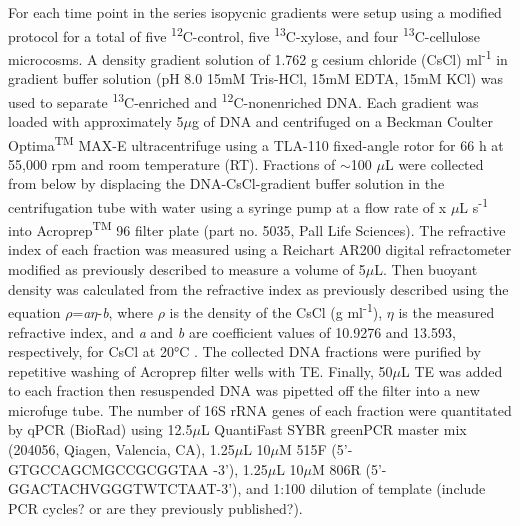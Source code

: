 For each time point in the series isopycnic gradients were setup using a modified protocol \cite{Neufeld_2007} for a total of five \textsuperscript{12}C-control, five \textsuperscript{13}C-xylose, and four \textsuperscript{13}C-cellulose microcosms. A density gradient solution of 1.762 g cesium chloride (CsCl) ml\textsuperscript{-1} in gradient buffer solution (pH 8.0 15mM Tris-HCl, 15mM EDTA, 15mM KCl) was used to separate \textsuperscript{13}C-enriched and \textsuperscript{12}C-nonenriched DNA. Each gradient was loaded with approximately 5$\mu$g of DNA and centrifuged on a Beckman Coulter Optima\textsuperscript{TM} MAX-E ultracentrifuge using a TLA-110 fixed-angle rotor for 66 h at 55,000 rpm and room temperature (RT). Fractions of $\sim$100 $\mu$L were collected from below by displacing the DNA-CsCl-gradient buffer solution in the centrifugation tube with water using a syringe pump at a flow rate of x $\mu$L s\textsuperscript{-1} \cite{Manefield_2002} into Acroprep\textsuperscript{TM} 96 filter plate (part no. 5035, Pall Life Sciences). The refractive index of each fraction was measured using a Reichart AR200 digital refractometer modified as previously described \cite{Buckley_2007} to measure a volume of 5$\mu$L. Then buoyant density was calculated from the refractive index as previously described \cite{Buckley_2007} using the equation $\rho$=\textit{a}$\eta$-\textit{b}, where $\rho$ is the density of the CsCl (g ml\textsuperscript{-1}), $\eta$ is the measured refractive index, and \textit{a} and \textit{b} are coefficient values of 10.9276 and 13.593, respectively, for CsCl at 20°C \cite{9780408708036}. The collected DNA fractions were purified by repetitive washing of Acroprep filter wells with TE. Finally, 50$\mu$L TE was added to each fraction then resuspended DNA was pipetted off the filter into a new microfuge tube. The number of 16S rRNA genes of each fraction were quantitated by qPCR (BioRad) using 12.5$\mu$L QuantiFast  SYBR greenPCR  master mix (204056, Qiagen, Valencia, CA), 1.25$\mu$L 10$\mu$M 515F (5'-GTGCCAGCMGCCGCGGTAA -3'), 1.25$\mu$L 10$\mu$M 806R (5'-GGACTACHVGGGTWTCTAAT-3'), and 1:100 dilution of template (include PCR cycles? or are they previously published?). 

